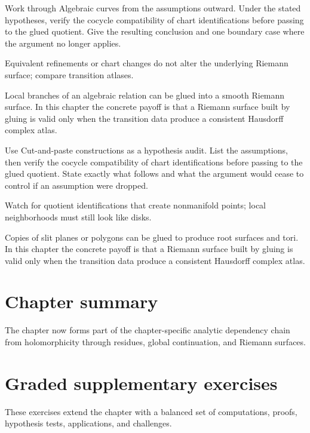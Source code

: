 \begin{exercise}\label{exr:iv25-07}
Work through Algebraic curves from the assumptions outward. Under the stated hypotheses, verify the cocycle compatibility of chart identifications before passing to the glued quotient. Give the resulting conclusion and one boundary case where the argument no longer applies.
\end{exercise}
\begin{hint}
Equivalent refinements or chart changes do not alter the underlying Riemann surface; compare transition atlases.
\end{hint}
\begin{solution}
Local branches of an algebraic relation can be glued into a smooth Riemann surface. In this chapter the concrete payoff is that a Riemann surface built by gluing is valid only when the transition data produce a consistent Hausdorff complex atlas.
\end{solution}

\begin{exercise}\label{exr:iv25-08}
Use Cut-and-paste constructions as a hypothesis audit. List the assumptions, then verify the cocycle compatibility of chart identifications before passing to the glued quotient. State exactly what follows and what the argument would cease to control if an assumption were dropped.
\end{exercise}
\begin{hint}
Watch for quotient identifications that create nonmanifold points; local neighborhoods must still look like disks.
\end{hint}
\begin{solution}
Copies of slit planes or polygons can be glued to produce root surfaces and tori. In this chapter the concrete payoff is that a Riemann surface built by gluing is valid only when the transition data produce a consistent Hausdorff complex atlas.
\end{solution}

\section*{Chapter summary}
The chapter now forms part of the chapter-specific analytic dependency chain from holomorphicity through residues, global continuation, and Riemann surfaces.
\section{Graded supplementary exercises}
These exercises extend the chapter with a balanced set of computations, proofs, hypothesis tests, applications, and challenges.

